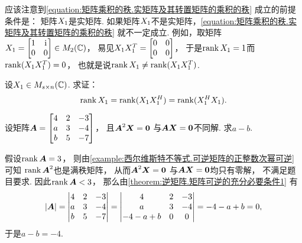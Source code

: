 \begin{remark}
应该注意到\cref{equation:矩阵乘积的秩.实矩阵及其转置矩阵的乘积的秩} 成立的前提条件是：
矩阵\(X_1\)是实矩阵.
如果矩阵\(X_1\)不是实矩阵，\cref{equation:矩阵乘积的秩.实矩阵及其转置矩阵的乘积的秩} 就不一定成立.
例如，取矩阵\(X_1 = \begin{bmatrix}
	1 & \kern1pt\mathrm{i}\kern1pt \\
	0 & 0
\end{bmatrix}
\in M_2(\mathbb{C})\)，
易见\(X_1 X_1^T = \begin{bmatrix}
	0 & 0 \\
	0 & 0
\end{bmatrix}\)，
于是\(\rank X_1=1\)而\(\rank(X_1X_1^T)=0\)，
也就是说\(\rank X_1\neq\rank(X_1X_1^T)\).
\end{remark}
\begin{example}
设\(X_1 \in M_{s \times n}(\mathbb{C})\).
求证：\begin{equation}
	\rank X_1 = \rank(X_1 X_1^H) = \rank(X_1^H X_1).
\end{equation}
\end{example}

\begin{example}
设矩阵\(\boldsymbol{A} = \begin{bmatrix}
	4 & 2 & -3 \\
	a & 3 & -4 \\
	b & 5 & -7
\end{bmatrix}\)，
且\(\boldsymbol{A}^2 \boldsymbol{X} = \boldsymbol0\)
与\(\boldsymbol{A} \boldsymbol{X} = \boldsymbol0\)不同解.
求\(a-b\).
\begin{solution}
假设\(\rank\boldsymbol{A} = 3\)，
则由\cref{example:西尔维斯特不等式.可逆矩阵的正整数次幂可逆} 可知
\(\rank\boldsymbol{A}^2\)也是满秩矩阵，
从而\(\boldsymbol{A}^2 \boldsymbol{X} = \boldsymbol0\)
与\(\boldsymbol{A} \boldsymbol{X} = \boldsymbol0\)均只有零解，
不满足题目要求.
因此\(\rank\boldsymbol{A} < 3\)，
那么由\cref{theorem:逆矩阵.矩阵可逆的充分必要条件1} 有\begin{equation*}
	\abs{\boldsymbol{A}}
	= \begin{vmatrix}
		4 & 2 & -3 \\
		a & 3 & -4 \\
		b & 5 & -7
	\end{vmatrix}
	= \begin{vmatrix}
		4 & 2 & -3 \\
		a & 3 & -4 \\
		-4-a+b & 0 & 0
	\end{vmatrix}
	= -4 - a + b
	= 0,
\end{equation*}
于是\(a-b=-4\).
\end{solution}
\end{example}
